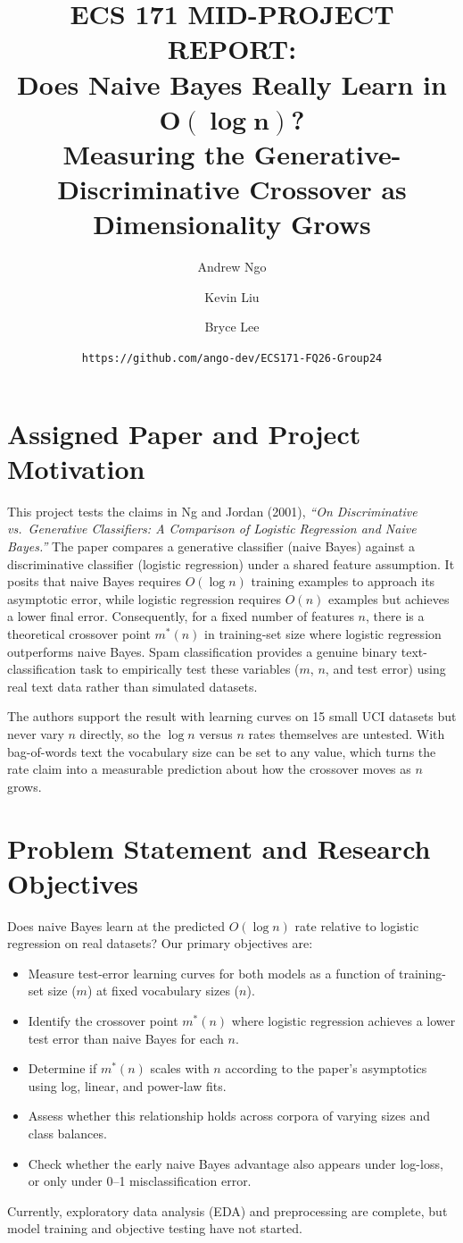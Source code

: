 \documentclass[11pt]{article}
\title{\vspace{-1.6cm}\textbf{ECS 171 MID-PROJECT REPORT:\\ Does Naive Bayes Really Learn in $\boldsymbol{O(\log n)}$?}\\[0.4ex] \Large\textbf{Measuring the Generative-Discriminative Crossover as Dimensionality Grows}}
\author{Andrew Ngo \and Kevin Liu \and Bryce Lee}
\date{\small\texttt{https://github.com/ango-dev/ECS171-FQ26-Group24}}
\begin{document}
\maketitle
\vspace{-2.2em}

\section{Assigned Paper and Project Motivation}

This project tests the claims in Ng and Jordan (2001), \textit{``On Discriminative vs.\ Generative Classifiers: A Comparison of Logistic Regression and Naive Bayes.''} The paper compares a generative classifier (naive Bayes) against a discriminative classifier (logistic regression) under a shared feature assumption. It posits that naive Bayes requires $O(\log n)$ training examples to approach its asymptotic error, while logistic regression requires $O(n)$ examples but achieves a lower final error. Consequently, for a fixed number of features $n$, there is a theoretical crossover point $m^*(n)$ in training-set size where logistic regression outperforms naive Bayes. Spam classification provides a genuine binary text-classification task to empirically test these variables ($m$, $n$, and test error) using real text data rather than simulated datasets.

The authors support the result with learning curves on 15 small UCI datasets but never vary $n$ directly, so the $\log n$ versus $n$ rates themselves are untested. With bag-of-words text the vocabulary size can be set to any value, which turns the rate claim into a measurable prediction about how the crossover moves as $n$ grows.

\section{Problem Statement and Research Objectives}

Does naive Bayes learn at the predicted $O(\log n)$ rate relative to logistic regression on real datasets? Our primary objectives are:
\begin{itemize}
  \item Measure test-error learning curves for both models as a function of training-set size ($m$) at fixed vocabulary sizes ($n$).
  \item Identify the crossover point $m^*(n)$ where logistic regression achieves a lower test error than naive Bayes for each $n$.
  \item Determine if $m^*(n)$ scales with $n$ according to the paper's asymptotics using log, linear, and power-law fits.
  \item Assess whether this relationship holds across corpora of varying sizes and class balances.
  \item Check whether the early naive Bayes advantage also appears under log-loss, or only under 0--1 misclassification error.
\end{itemize}
Currently, exploratory data analysis (EDA) and preprocessing are complete, but model training and objective testing have not started.
\end{document}
